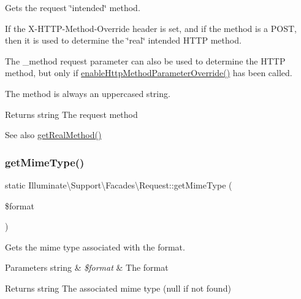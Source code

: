 Gets the request \char`\"{}intended\char`\"{} method.

If the X-\/\+H\+T\+T\+P-\/\+Method-\/\+Override header is set, and if the method is a P\+O\+ST, then it is used to determine the \char`\"{}real\char`\"{} intended H\+T\+TP method.

The \+\_\+method request parameter can also be used to determine the H\+T\+TP method, but only if \mbox{\hyperlink{class_illuminate_1_1_support_1_1_facades_1_1_request_a39cf798202cb88125c454d7813767a01}{enable\+Http\+Method\+Parameter\+Override()}} has been called.

The method is always an uppercased string.

\begin{DoxyReturn}{Returns}
string The request method 
\end{DoxyReturn}
\begin{DoxySeeAlso}{See also}
\mbox{\hyperlink{class_illuminate_1_1_support_1_1_facades_1_1_request_acd2706ec8b8c53211875908b1246dd98}{get\+Real\+Method()}} 
\end{DoxySeeAlso}
\mbox{\label{class_illuminate_1_1_support_1_1_facades_1_1_request_a6520afcea661e1a2f5918103d15346b1}} 
\subsubsection{\texorpdfstring{get\+Mime\+Type()}{getMimeType()}}
{\footnotesize\ttfamily static Illuminate\textbackslash{}\+Support\textbackslash{}\+Facades\textbackslash{}\+Request\+::get\+Mime\+Type (\begin{DoxyParamCaption}\item[{}]{\$format }\end{DoxyParamCaption})\hspace{0.3cm}{\ttfamily [static]}}

Gets the mime type associated with the format.


\begin{DoxyParams}[1]{Parameters}
string & {\em \$format} & The format \\
\hline
\end{DoxyParams}
\begin{DoxyReturn}{Returns}
string The associated mime type (null if not found) 
\end{DoxyReturn}
\mbox{\label{class_illuminate_1_1_support_1_1_facades_1_1_request_a8037ea4a5f96207a0621c135ec663dff}} 
